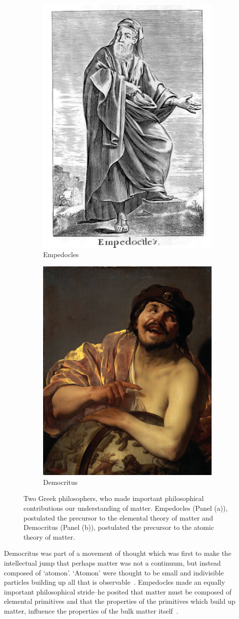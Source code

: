 \begin{figure}[ht]
	\centering
	\begin{subfigure}{.5\textwidth}
		\centering
		\includegraphics[width=0.4\linewidth]{./figures/empedocles.jpg}
		\caption{Empedocles \cite{Stanley1655}}
		\label{fig:empedocles}
	\end{subfigure}%
	\begin{subfigure}{0.5\textwidth}
		\centering
		\includegraphics[width=0.4\linewidth]{./figures/democritus.jpg}
		\caption{Democritus \cite{Brugghen1628}}
		\label{fig:democritus}
	\end{subfigure}
  \caption{ 
    Two Greek philosophers, who made important philosophical contributions our
    understanding of matter. Empedocles (Panel (a)), postulated the precursor
    to the elemental theory of matter\cite{Long1949} and Democritus (Panel
    (b)), postulated the precursor to the atomic theory of matter.  
  }
	\label{fig:atomists}
\end{figure}

Democritus was part of a movement of thought which was first to make the
intellectual jump that perhaps matter was not a continuum, but instead composed
of `atomon'. `Atomon' were thought to be small and indivisible particles
building up all that is observable~\cite{Baldes1978}.  Empedocles made an
equally important philosophical stride--he posited that matter must be composed
of elemental primitives and that the properties of the primitives which build
up matter, influence the properties of the bulk matter itself~\cite{Long1949}.

